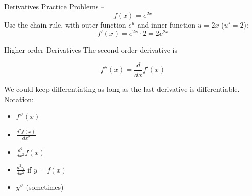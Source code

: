 \documentclass[aspectratio=169]{beamer}
\begin{document}
\begin{frame}{Derivatives Practice Problems -- }\label{main1}
	\vspace{-1cm}
     \[
    f(x) = e^{2x}
    \]
    \vspace{0.5em}
    Use the chain rule, with outer function $e^u$ and inner function $u=2x$ ($u'=2$):
    \[
    f'(x) = e^{2x} \cdot 2 = 2e^{2x}
    \]
\end{frame}

\begin{frame}{Higher-order Derivatives}\label{main1}
The second-order derivative is

\[
f''(x) = \frac{d}{dx} f'(x)
\]

We could keep differentiating as long as the last derivative is differentiable. Notation:
\begin{itemize}
\begin{itemize}
    \item $f''(x)$
    \item $\frac{d^2 f(x)}{dx^2}$
    \item $\frac{d^2}{dx^2} f(x)$
    \item $\frac{d^2 y}{dx^2}$ if $y = f(x)$
    \item $y''$ (sometimes)
\end{itemize}
\end{itemize}
\end{frame}
\end{document}
